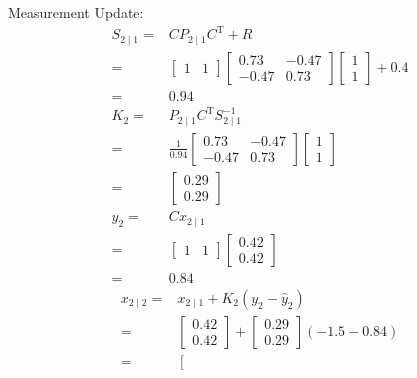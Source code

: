 \documentclass[twoside]{article}
\renewcommand{\t}{^\mathrm{T}{}}
\begin{document}
\begin{itemize}
	Measurement Update:
\begin{align*}
	S_{2\mid 1} =& C P_{2\mid1}C\t+R\\
	=& \left[\begin{array}{cc}
		1 & 1
	\end{array} \right] \left[ \begin{array}{cc}
		0.73 & -0.47 \\ -0.47 & 0.73
	\end{array}\right]\left[ \begin{array}{c}
		1 \\ 1
	\end{array}\right] + 0.4\\
	=& 0.94\\
	K_2 =& P_{2\mid1}C\t S^{-1}_{2\mid1}\\
	=&\frac{1}{0.94}\left[ \begin{array}{cc}
		0.73 & -0.47 \\ -0.47 & 0.73
	\end{array}\right]\left[ \begin{array}{c}
		1 \\ 1
	\end{array}\right]\\
	=& \left[ \begin{array}{c}
		0.29 \\ 0.29
	\end{array}\right]\\
	\hat y_2 =& C x_{2\mid1}\\
	=& \left[\begin{array}{cc}
		1 & 1
	\end{array} \right] \left[ \begin{array}{c}
		0.42 \\ 0.42
	\end{array}\right] \\
	=& 0.84
\end{align*}
\begin{align*}
	x_{2\mid2} =& x_{2\mid1}+K_2(y_2-\hat y_2)\\
	=& \left[ \begin{array}{c}
		0.42 \\ 0.42
	\end{array}\right] + \left[ \begin{array}{c}
		0.29 \\ 0.29
	\end{array}\right] (-1.5-0.84)\\
	=&\left[ \begin{array}{c}

\end{array}
\end{align*}
\end{itemize}
\end{document}
